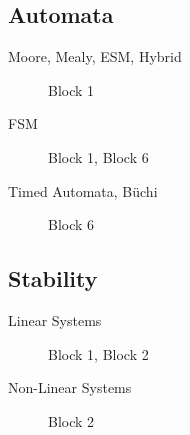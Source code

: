 
\subsection*{Automata}
\begin{description}
	\item[Moore, Mealy, ESM, Hybrid] Block 1
	\item[FSM] Block 1, Block 6
	\item[Timed Automata, Büchi] Block 6
\end{description}

\subsection*{Stability}
\begin{description}
	\item[Linear Systems] Block 1, Block 2
	\item[Non-Linear Systems] Block 2
\end{description}